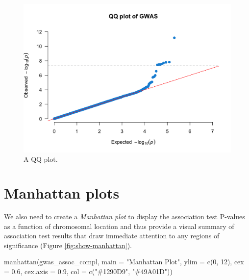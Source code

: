 \documentclass[
]{book}
\newenvironment{Shaded}{\begin{snugshade}}{\end{snugshade}}
\newcommand{\AttributeTok}[1]{\textcolor[rgb]{0.77,0.63,0.00}{#1}}
\newcommand{\DecValTok}[1]{\textcolor[rgb]{0.00,0.00,0.81}{#1}}
\newcommand{\FloatTok}[1]{\textcolor[rgb]{0.00,0.00,0.81}{#1}}
\newcommand{\FunctionTok}[1]{\textcolor[rgb]{0.00,0.00,0.00}{#1}}
\newcommand{\NormalTok}[1]{#1}
\newcommand{\StringTok}[1]{\textcolor[rgb]{0.31,0.60,0.02}{#1}}
\begin{document}
\begin{figure}

{\centering \includegraphics[width=18.67in]{img/_gwas/show-qq} 

}

\caption{A QQ plot.}\label{fig:show-qq}
\end{figure}

\hypertarget{manhattan-plots}{%
\section{Manhattan plots}\label{manhattan-plots}}

We also need to create a \emph{Manhattan plot} to display the association test P-values as a function of chromosomal location and thus provide a visual summary of association test results that draw immediate attention to any regions of significance (Figure \ref{fig:show-manhattan}).

\begin{Shaded}
\begin{Highlighting}[]
\FunctionTok{manhattan}\NormalTok{(gwas\_assoc\_compl, }\AttributeTok{main =} \StringTok{"Manhattan Plot"}\NormalTok{,}
          \AttributeTok{ylim =} \FunctionTok{c}\NormalTok{(}\DecValTok{0}\NormalTok{, }\DecValTok{12}\NormalTok{),}
          \AttributeTok{cex =} \FloatTok{0.6}\NormalTok{, }\AttributeTok{cex.axis =} \FloatTok{0.9}\NormalTok{,}
          \AttributeTok{col =} \FunctionTok{c}\NormalTok{(}\StringTok{"\#1290D9"}\NormalTok{, }\StringTok{"\#49A01D"}\NormalTok{))}
\end{Highlighting}
\end{Shaded}
\end{document}
